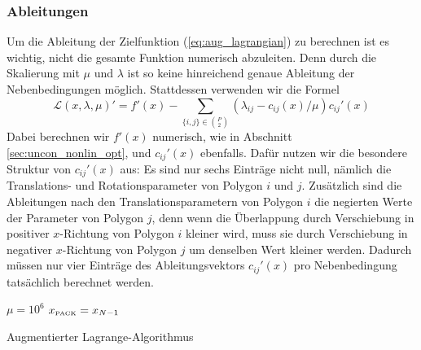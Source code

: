 \documentclass[runningheads,a4paper]{llncs}
\begin{document}
\subsubsection{Ableitungen}
Um die Ableitung der Zielfunktion (\ref{eq:aug_lagrangian}) zu berechnen ist es wichtig, nicht die gesamte Funktion numerisch abzuleiten. Denn durch die Skalierung mit $\mu$ und $\lambda$ ist so keine hinreichend genaue Ableitung der Nebenbedingungen möglich. Stattdessen verwenden wir die Formel \cite{nocedal1999numerical}
\begin{equation*}
\mathcal{L}(x,\lambda,\mu)' = f'(x) - \sum_{\{i,j\}\in {P \choose 2}}(\lambda_{ij} - c_{ij}(x)/\mu) c_{ij}'(x)
\end{equation*}
Dabei berechnen wir $f'(x)$ numerisch, wie in Abschnitt \ref{sec:uncon_nonlin_opt}, und $c_{ij}'(x)$ ebenfalls. Dafür nutzen wir die besondere Struktur von $c_{ij}'(x)$ aus: Es sind nur sechs Einträge nicht null, nämlich die Translations- und Rotationsparameter von Polygon $i$ und $j$. Zusätzlich sind die Ableitungen nach den Translationsparametern von Polygon $i$ die negierten Werte der Parameter von Polygon $j$, denn wenn die Überlappung durch Verschiebung in positiver $x$-Richtung von Polygon $i$ kleiner wird, muss sie durch Verschiebung in negativer $x$-Richtung von Polygon $j$ um denselben Wert kleiner werden. Dadurch müssen nur vier Einträge des Ableitungsvektors $c_{ij}'(x)$ pro Nebenbedingung tatsächlich berechnet werden.
\vspace{1.5em}

\begin{algorithm}[H]
\DontPrintSemicolon{}
\SetAlgoLined
{}
\BlankLine{}
$\mu = 10^6$\;
\ForEach{$i \in [0,N)$}{
	Sei $g(x) := \mathcal{L}(x, \lambda, \mu)$\;
	$x_{i+1} \leftarrow BFGS(x_0=x_i, f=g, N=500)$\;
	\If{Lösung gültig für gewünschte Genauigkeit}{
		\Return $x_{\text{\tiny{PACK}}} = x_{i+1}$ 
	}
	$\mu \leftarrow 0.5\mu$\;
	\ForEach{$c_{ij}$}{
		Update $\lambda_{ij}$ nach Formel (\ref{eq:update_lagrange_mult})\;
	}
}
\Return $x_{\text{\tiny{PACK}}} = x_{N-1}$\;
\caption{Augmentierter Lagrange-Algorithmus}
\label{alg:lagrange}
\end{algorithm}
\vspace{1.5em}
\end{document}
